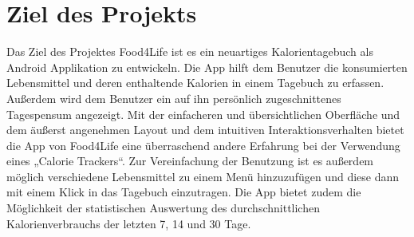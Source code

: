 \section{Ziel des Projekts}
\label{concept}
Das Ziel des Projektes Food4Life ist es ein neuartiges Kalorientagebuch als Android Applikation zu entwickeln. Die App hilft dem Benutzer die konsumierten Lebensmittel und deren enthaltende Kalorien in einem Tagebuch zu erfassen. Außerdem wird dem Benutzer ein auf ihn persönlich zugeschnittenes Tagespensum angezeigt. Mit der einfacheren und übersichtlichen Oberfläche und dem äußerst angenehmen Layout und dem intuitiven Interaktionsverhalten bietet die App von Food4Life eine überraschend andere Erfahrung bei der Verwendung eines „Calorie Trackers“. Zur Vereinfachung der Benutzung ist es außerdem möglich verschiedene Lebensmittel zu einem Menü hinzuzufügen und diese dann mit einem Klick in das Tagebuch einzutragen. Die App bietet zudem die Möglichkeit der statistischen Auswertung des durchschnittlichen Kalorienverbrauchs der letzten 7, 14 und 30 Tage. 

